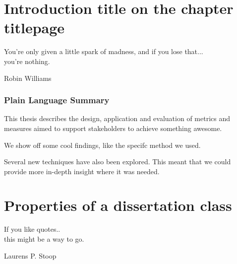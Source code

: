 \documentclass[]{dissertation}
\begin{document}
\part[Introduction title in the TOC]{Introduction title on the chapter titlepage}
\label{part:intro}



\epigraph{
       You're only given a little spark of madness, and if you lose that... \\ you're nothing.
}{Robin Williams}

\section*{Plain Language Summary}
This thesis describes the design, application and evaluation of metrics and measures aimed to support stakeholders to achieve something awesome. 

We show off some cool findings, like the specifc method we used.

Several new techniques have also been explored. 
This meant that we could provide more in-depth insight where it was needed. 

\newpage
\chaptoc








\cleardoublepage






\setcounter{colorcounter}{2}
\part[Properties of a dissertation class]{Properties of a dissertation class}
\label{part:second}

\epigraph{
       If you like quotes.. \\ this might be a way to go.
}{Laurens P. Stoop}
\end{document}
